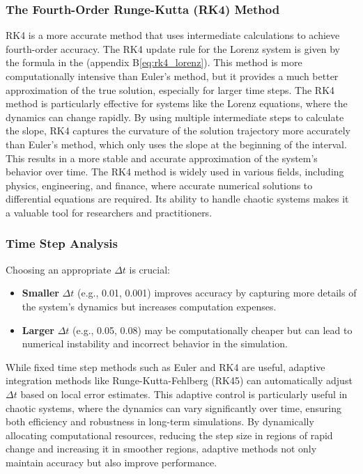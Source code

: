 \subsubsection{The Fourth-Order Runge-Kutta (RK4) Method}

RK4 is a more accurate method that uses intermediate calculations to achieve fourth-order accuracy. The RK4 update rule for the Lorenz system is given by the formula in the (appendix B\ref{eq:rk4_lorenz}). This method is more computationally intensive than Euler's method, but it provides a much better approximation of the true solution, especially for larger time steps.
The RK4 method is particularly effective for systems like the Lorenz equations, where the dynamics can change rapidly. By using multiple intermediate steps to calculate the slope, RK4 captures the curvature of the solution trajectory more accurately than Euler's method, which only uses the slope at the beginning of the interval. This results in a more stable and accurate approximation of the system's behavior over time.
The RK4 method is widely used in various fields, including physics, engineering, and finance, where accurate numerical solutions to differential equations are required. Its ability to handle chaotic systems makes it a valuable tool for researchers and practitioners.

\subsubsection{Time Step Analysis}

Choosing an appropriate $\Delta t$ is crucial:

\begin{itemize}
    \item \textbf{Smaller} $\Delta t$ (e.g., 0.01, 0.001) improves accuracy by capturing more details of the system’s dynamics but increases computation expenses.
    \item \textbf{Larger} $\Delta t$ (e.g., 0.05, 0.08) may be computationally cheaper but can lead to numerical instability and incorrect behavior in the simulation.
\end{itemize}
While fixed time step methods such as Euler and RK4 are useful, adaptive integration methods like Runge-Kutta-Fehlberg (RK45) can automatically adjust $\Delta t$ based on local error estimates. This adaptive control is particularly useful in chaotic systems, where the dynamics can vary significantly over time, ensuring both efficiency and robustness in long-term simulations. By dynamically allocating computational resources, reducing the step size in regions of rapid change and increasing it in smoother regions, adaptive methods not only maintain accuracy but also improve performance.


